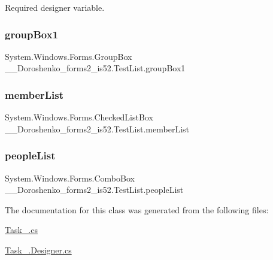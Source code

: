 Required designer variable. 

\hypertarget{class__7___doroshenko__forms2__is52_1_1_test_list_aeeecfa4dc8c9c35fc0fd627d191804c1}{}\label{class__7___doroshenko__forms2__is52_1_1_test_list_aeeecfa4dc8c9c35fc0fd627d191804c1} 
\subsubsection{\texorpdfstring{group\+Box1}{groupBox1}}
{\footnotesize\ttfamily System.\+Windows.\+Forms.\+Group\+Box \+\_\+\_\+\+Doroshenko\+\_\+forms2\+\_\+is52.\+Test\+List.\+group\+Box1\hspace{0.3cm}{\ttfamily [private]}}

\hypertarget{class__7___doroshenko__forms2__is52_1_1_test_list_a6ae8b83f659e1c9aa5870f96aa553f0e}{}\label{class__7___doroshenko__forms2__is52_1_1_test_list_a6ae8b83f659e1c9aa5870f96aa553f0e} 
\subsubsection{\texorpdfstring{member\+List}{memberList}}
{\footnotesize\ttfamily System.\+Windows.\+Forms.\+Checked\+List\+Box \+\_\+\_\+\+Doroshenko\+\_\+forms2\+\_\+is52.\+Test\+List.\+member\+List\hspace{0.3cm}{\ttfamily [private]}}

\hypertarget{class__7___doroshenko__forms2__is52_1_1_test_list_a79206bb1b99520d725562d5b3aef35cb}{}\label{class__7___doroshenko__forms2__is52_1_1_test_list_a79206bb1b99520d725562d5b3aef35cb} 
\subsubsection{\texorpdfstring{people\+List}{peopleList}}
{\footnotesize\ttfamily System.\+Windows.\+Forms.\+Combo\+Box \+\_\+\_\+\+Doroshenko\+\_\+forms2\+\_\+is52.\+Test\+List.\+people\+List\hspace{0.3cm}{\ttfamily [private]}}



The documentation for this class was generated from the following files\+:\begin{DoxyCompactItemize}
\item 
\hyperlink{_task__2_8cs}{Task\+\_.\+cs}\item 
\hyperlink{_task__2_8_designer_8cs}{Task\+\_.\+Designer.\+cs}\end{DoxyCompactItemize}
